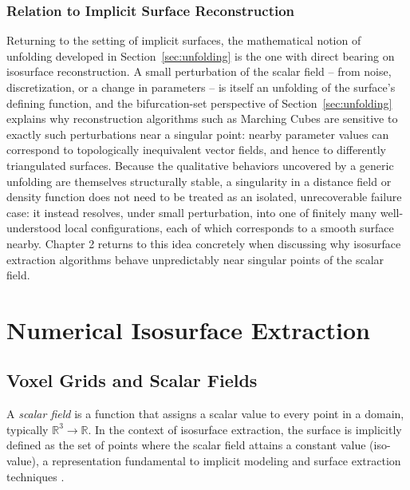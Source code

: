\documentclass[12pt, a4paper, oneside]{book}
\theoremstyle{plain}
\theoremstyle{definition}
\theoremstyle{remark}
\theoremstyle{definition}
\begin{document}
\subsection{Relation to Implicit Surface Reconstruction}

Returning to the setting of implicit surfaces, the mathematical notion of unfolding developed in Section~\ref{sec:unfolding} is the one with direct bearing on isosurface reconstruction. A small perturbation of the scalar field -- from noise, discretization, or a change in parameters -- is itself an unfolding of the surface's defining function, and the bifurcation-set perspective of Section~\ref{sec:unfolding} explains why reconstruction algorithms such as Marching Cubes are sensitive to exactly such perturbations near a singular point: nearby parameter values can correspond to topologically inequivalent vector fields, and hence to differently triangulated surfaces. Because the qualitative behaviors uncovered by a generic unfolding are themselves structurally stable, a singularity in a distance field or density function does not need to be treated as an isolated, unrecoverable failure case: it instead resolves, under small perturbation, into one of finitely many well-understood local configurations, each of which corresponds to a smooth surface nearby. Chapter 2 returns to this idea concretely when discussing why isosurface extraction algorithms behave unpredictably near singular points of the scalar field.

\chapter{Numerical Isosurface Extraction}
\section{Voxel Grids and Scalar Fields}

A \emph{scalar field} is a function that assigns a scalar value to every point in a domain, typically $\mathbb{R}^3 \rightarrow \mathbb{R}$. In the context of isosurface extraction, the surface is implicitly defined as the set of points where the scalar field attains a constant value (iso-value), a representation fundamental to implicit modeling and surface extraction techniques \cite{bloomenthal1997introduction}.
\end{document}
